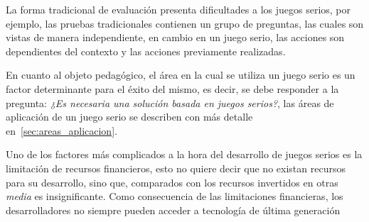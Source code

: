 La forma tradicional de evaluación presenta dificultades a los juegos serios,
por ejemplo, las pruebas tradicionales contienen un grupo de preguntas, las
cuales son vistas de manera independiente, en cambio en un juego serio, las
acciones son dependientes del contexto y las acciones previamente
realizadas\cite{shute2009melding}.

En cuanto al objeto pedagógico, el área en la cual se utiliza un juego serio es
un factor determinante para el éxito del mismo, es decir, se debe responder a la
pregunta: \emph{¿Es necesaria una solución basada en juegos
    serios?}\cite{stapleton2004serious}, las áreas de aplicación de un juego
serio se describen con más detalle en~\ref{sec:areas_aplicacion}.

Uno de los factores más complicados a la hora del desarrollo de juegos serios es
la limitación de recursos financieros, esto no quiere decir que no existan
recursos para su desarrollo, sino que, comparados con los recursos invertidos en
otras \textit{media} es insignificante\cite{stapleton2004serious}. Como
consecuencia de las limitaciones financieras, los desarrolladores no siempre
pueden acceder a tecnología de última generación\cite{stapleton2004serious}
